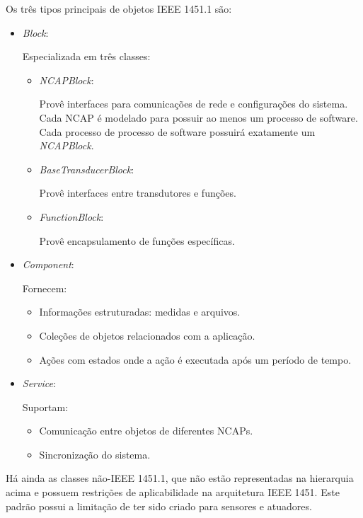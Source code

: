 Os três tipos principais de objetos IEEE 1451.1 são:

\begin{itemize}
	\item\emph{Block}:

	Especializada em três classes:
		\begin{itemize}
			\item\emph{NCAPBlock}:

				Provê interfaces para comunicações de rede e configurações do sistema. Cada NCAP é modelado para possuir ao menos um processo de software. Cada processo de processo de software possuirá exatamente um \emph{NCAPBlock}.
			\item\emph{BaseTransducerBlock}:

				Provê interfaces entre transdutores e funções.
			\item\emph{FunctionBlock}:

				Provê encapsulamento de funções específicas.
		\end{itemize}
	
	\item\emph{Component}:
	
		Fornecem:
		\begin{itemize}
			\item Informações estruturadas: medidas e arquivos.
			\item Coleções de objetos relacionados com a aplicação.
			\item Ações com estados onde a ação é executada após um período de tempo.
		\end{itemize}
	\item\emph{Service}:
	
		Suportam:
		\begin{itemize}
			\item Comunicação entre objetos de diferentes NCAPs.
			\item Sincronização do sistema.
		\end{itemize}
\end{itemize}

Há ainda as classes não-IEEE 1451.1, que não estão representadas na hierarquia acima e possuem restrições de aplicabilidade na arquitetura IEEE 1451. Este padrão possui a limitação de ter sido criado para sensores e atuadores.


